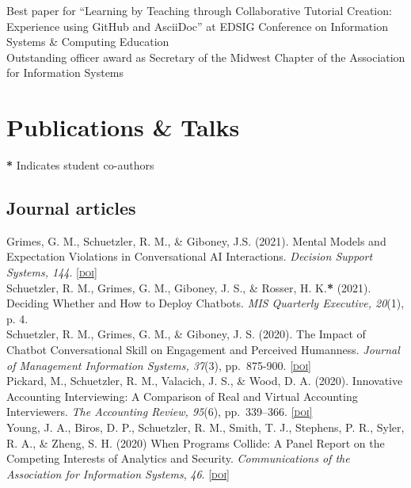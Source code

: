 \documentclass[10pt, letter]{article}
\newcommand{\doi}[1]{\href{#1}{\scriptsize\textsc{[doi]}}}
\newcommand{\years}[1]{\marginnote{\scriptsize #1}}
\begin{document}
\years{} Best paper for ``Learning by Teaching through Collaborative Tutorial Creation: Experience using GitHub and AsciiDoc'' at EDSIG Conference on Information Systems \& Computing Education\\

\years{} Outstanding officer award as Secretary of the Midwest Chapter of the Association for Information Systems

\section*{Publications \& Talks}

\textbf{*} Indicates student co-authors

\subsection*{Journal articles}
\noindent
\years{2021}Grimes, G. M., Schuetzler, R. M., \& Giboney, J.S. (2021). Mental Models and Expectation Violations in Conversational AI Interactions.
\emph{Decision Support Systems, 144}. \doi{https://doi.org/10.1016/j.dss.2021.113515}\\

\years{}Schuetzler, R. M., Grimes, G. M., Giboney, J. S., \& Rosser, H. K.\textbf{*} (2021). Deciding Whether and How to Deploy Chatbots.
\emph{MIS Quarterly Executive, 20}(1), p. 4.\\

\years{2020} Schuetzler, R. M., Grimes, G. M., \& Giboney, J. S. (2020). 
The Impact of Chatbot Conversational Skill on Engagement and Perceived Humanness. 
\emph{Journal of Management Information Systems, 37}(3), pp.\ 875-900. 
\doi{https://doi.org/10.1080/07421222.2020.1790204}\\

\years{} Pickard, M., Schuetzler, R. M., Valacich, J. S., \& Wood, D. A. (2020). 
Innovative Accounting Interviewing: A Comparison of Real and Virtual Accounting Interviewers. 
\emph{The Accounting Review, 95}(6), pp.\ 339--366.
\doi{https://doi.org/10.2308/tar-2017-0235}\\

\years{} Young, J. A., Biros, D. P., Schuetzler, R. M., Smith, T. J., Stephens, P. R., 
Syler, R. A., \& Zheng, S. H. (2020) When Programs Collide: A Panel Report on the Competing 
Interests of Analytics and Security. \emph{Communications of the Association for Information Systems}, 
\emph{46}. \doi{https://doi.org/10.17705/1CAIS.04624}\\
\end{document}
